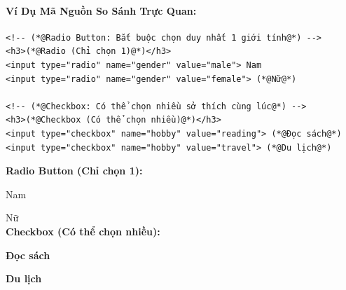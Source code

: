 \documentclass[11pt,oneside]{book}
\begin{document}
\paragraph{Ví Dụ Mã Nguồn So Sánh Trực Quan:}

\begin{codeWindow}
\begin{lstlisting}[language=HTML5]
<!-- (*@Radio Button: Bắt buộc chọn duy nhất 1 giới tính@*) -->
<h3>(*@Radio (Chỉ chọn 1)@*)</h3>
<input type="radio" name="gender" value="male"> Nam  
<input type="radio" name="gender" value="female"> (*@Nữ@*)  

<!-- (*@Checkbox: Có thể chọn nhiều sở thích cùng lúc@*) -->
<h3>(*@Checkbox (Có thể chọn nhiều)@*)</h3>
<input type="checkbox" name="hobby" value="reading"> (*@Đọc sách@*)  
<input type="checkbox" name="hobby" value="travel"> (*@Du lịch@*)  
\end{lstlisting}
\end{codeWindow}

\begin{browserWindow}
\sffamily\small
\textbf{Radio Button (Chỉ chọn 1):} \\[4pt]
 \; Nam \qquad
{} \; Nữ \\[10pt]
\textbf{Checkbox (Có thể chọn nhiều):} \\[4pt]
 \; \textbf{Đọc sách} \qquad
{} \; \textbf{Du lịch}
\end{browserWindow}

\end{document}
